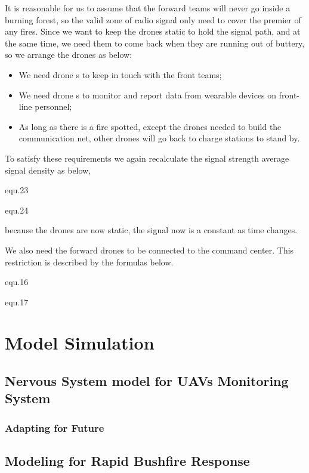 \documentclass[13pt]{ctexart} %
\begin{document}
It is reasonable for us to assume that the forward teams will never go inside a burning forest, so the valid zone of radio signal only need to cover the premier of any fires. Since we want to keep the drones static to hold the signal path, and at the same time, we need them to come back when they are running out of buttery, so we arrange the drones as below:

\begin{itemize}
    \item We need drone \uppercase\expandafter{}s to keep in touch with the front teams;
   \item We need drone \uppercase\expandafter{}s to monitor and report data from wearable devices on front-line personnel;
    \item As long as there is a fire spotted, except the drones needed to build the communication net, other drones will go back to charge stations to stand by.
\end{itemize}

To satisfy these requirements we again recalculate the signal strength average signal density as below,

{equ.23}

    {equ.24}

because the drones are now static, the signal now is a constant as time changes.

We also need the forward drones to be connected to the command center. This restriction is described by the formulas below.

    {equ.16}

    {equ.17}


\section{Model Simulation}


\subsection{Nervous System model for UAVs Monitoring System}


\subsubsection{Adapting for Future}


\subsection{Modeling for Rapid Bushfire Response}
\end{document}
